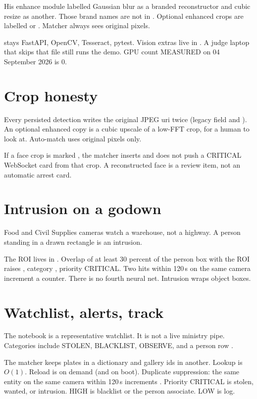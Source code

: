\documentclass[listings]{csf301-notes}
\begin{document}
His enhance module labelled Gaussian blur as a branded reconstructor and cubic resize as another. Those brand names are not in . Optional enhanced crops are labelled  or . Matcher always sees original pixels.

\begin{implnote}
 stays FastAPI, OpenCV, Tesseract, pytest. Vision extras live in . A judge laptop that skips that file still runs the demo. GPU count MEASURED on 04 September 2026 is 0.
\end{implnote}

\section{Crop honesty}
Every persisted detection writes the original JPEG uri twice (legacy field and ). An optional enhanced copy is a cubic upscale of a low-FFT crop, for a human to look at. Auto-match uses original pixels only.

If a face crop is marked , the matcher inserts  and does not push a CRITICAL WebSocket card from that crop. A reconstructed face is a review item, not an automatic arrest card.

\section{Intrusion on a godown}
Food and Civil Supplies cameras watch a warehouse, not a highway. A person standing in a drawn rectangle is an intrusion.

The ROI lives in . Overlap of at least 30 percent of the person box with the ROI raises , category , priority CRITICAL. Two hits within 120\,s on the same camera increment a counter. There is no fourth neural net. Intrusion wraps object boxes.

\section{Watchlist, alerts, track}
The notebook is a representative watchlist. It is not a live ministry pipe. Categories include STOLEN, BLACKLIST, OBSERVE, and a person row .

The matcher keeps plates in a dictionary and gallery ids in another. Lookup is $O(1)$. Reload is on demand (and on boot). Duplicate suppression: the same entity on the same camera within 120\,s increments . Priority CRITICAL is stolen, wanted, or intrusion. HIGH is blacklist or the person associate. LOW is log.
\end{document}
